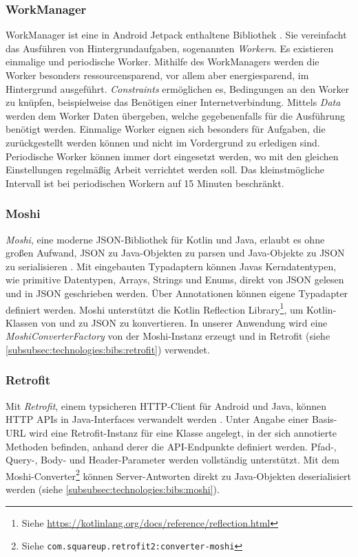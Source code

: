 \documentclass[a4paper]{article}
\begin{document}
\subsubsection{WorkManager}
\label{subsubsec:technologies:bibs:workmanager}
WorkManager ist eine in Android Jetpack enthaltene Bibliothek \autocite{android_workmanager}. Sie vereinfacht das Ausführen von Hintergrundaufgaben, sogenannten \textit{Workern}. Es existieren einmalige und periodische Worker. Mithilfe des WorkManagers werden die Worker besonders ressourcensparend, vor allem aber energiesparend, im Hintergrund ausgeführt. \textit{Constraints} ermöglichen es, Bedingungen an den Worker zu knüpfen, beispielweise das Benötigen einer Internetverbindung. Mittels \textit{Data} werden dem Worker Daten übergeben, welche gegebenenfalls für die Ausführung benötigt werden. Einmalige Worker eignen sich besonders für Aufgaben, die zurückgestellt werden können und nicht im Vordergrund zu erledigen sind. Periodische Worker können immer dort eingesetzt werden, wo mit den gleichen Einstellungen regelmäßig Arbeit verrichtet werden soll. Das kleinstmögliche Intervall ist bei periodischen Workern auf 15 Minuten beschränkt.


\subsubsection{Moshi}
\label{subsubsec:technologies:bibs:moshi}
\textit{Moshi}, eine moderne JSON-Bibliothek für Kotlin und Java, erlaubt es ohne großen Aufwand, JSON zu Java-Objekten zu parsen und Java-Objekte zu JSON zu serialisieren \autocite{moshi}. Mit eingebauten Typadaptern können Javas Kerndatentypen, wie primitive Datentypen, Arrays, Strings und Enums, direkt von JSON gelesen und in JSON geschrieben werden. Über Annotationen können eigene Typadapter definiert werden. Moshi unterstützt die Kotlin Reflection Library\footnote{Siehe \url{https://kotlinlang.org/docs/reference/reflection.html}}, um Kotlin-Klassen von und zu JSON zu konvertieren.
In unserer Anwendung wird eine \textit{MoshiConverterFactory} von der Moshi-Instanz erzeugt und in Retrofit (siehe \autoref{subsubsec:technologies:bibs:retrofit}) verwendet.


\subsubsection{Retrofit}
\label{subsubsec:technologies:bibs:retrofit}
Mit \textit{Retrofit}, einem typsicheren HTTP-Client für Android und Java, können HTTP APIs in Java-Interfaces verwandelt werden \autocite{retrofit}. Unter Angabe einer Basis-URL wird eine Retrofit-Instanz für eine Klasse angelegt, in der sich annotierte Methoden befinden, anhand derer die API-Endpunkte definiert werden. Pfad-, Query-, Body- und Header-Parameter werden vollständig unterstützt. Mit dem Moshi-Converter\footnote{Siehe \texttt{com.squareup.retrofit2:converter-moshi}} können Server-Antworten direkt zu Java-Objekten deserialisiert werden (siehe \autoref{subsubsec:technologies:bibs:moshi}).
\end{document}
